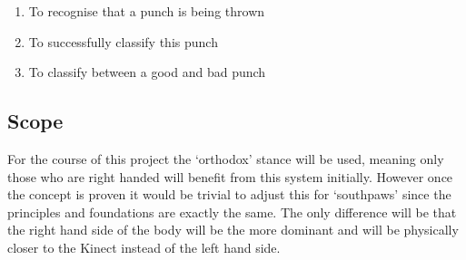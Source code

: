 \begin{enumerate}
  \item To recognise that a punch is being thrown
  \item To successfully classify this punch 
  \item To classify between a good and bad punch
\end{enumerate}

\subsection{Scope}
\label{subsec:subsec01}
For the course of this project the `orthodox' stance will be used, meaning only those who are right handed will benefit from this system initially. However once the concept is proven it would be trivial to adjust this for `southpaws' since the principles and foundations are exactly the same. The only difference will be that the right hand side of the body will be the more dominant and will be physically closer to the Kinect instead of the left hand side.